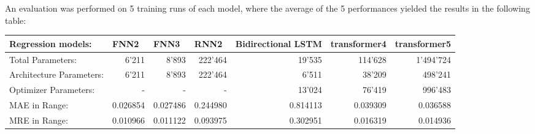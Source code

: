 \documentclass{article}
\begin{document}
An evaluation was performed on 5 training runs of each model, where the average of the 5 performances yielded the results in the following table\footnotemark: 
\\[0.5em]
\begin{table}[htbp]
\centering
\footnotesize
\begin{tabular}{|lr|r|r|r|r|r|r|}
\hline
\multicolumn{2}{|l|}{Regression models:}                                 & \multicolumn{1}{l|}{FNN2} & \multicolumn{1}{l|}{FNN3} & \multicolumn{1}{l|}{RNN2} & \multicolumn{1}{l|}{Bidirectional LSTM} & \multicolumn{1}{l|}{transformer4} & \multicolumn{1}{l|}{transformer5} \\ \hline
\multicolumn{2}{|l|}{Total   Parameters:}                                & 6'211                     & 8'893                     & 222'464                   & 19'535                                  & 114'628                           & 1'494'724                         \\
\multicolumn{2}{|l|}{Architecture   Parameters:}                         & 6'211                     & 8'893                     & 222'464                   & 6'511                                   & 38'209                            & 498'241                           \\
\multicolumn{2}{|l|}{Optimizer   Parameters:}                            & -                         & -                         & -                         & 13'024                                  & 76'419                            & 996'483                           \\
\rowcolor[HTML]{F7C7AC} 
MAE in Range:                                &                           & 0.026854                  & 0.027486                  & 0.244980                  & 0.814113                                & 0.039309                          & 0.036588                          \\
\rowcolor[HTML]{F7C7AC} 
MRE in Range:                                &                           & 0.010966                  & 0.011122                  & 0.093975                  & 0.302951                                & 0.016319                          & 0.014936                          \\

\end{tabular}
\end{table}
\end{document}
